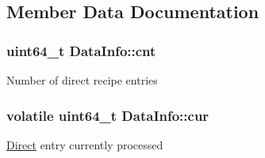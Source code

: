 \subsection{\-Member \-Data \-Documentation}
\hypertarget{structDataInfo_ad390a39f9b2b1bf9cb97b080f145e4cc}{
\subsubsection[{cnt}]{\setlength{\rightskip}{0pt plus 5cm}uint64\-\_\-t {\bf \-Data\-Info\-::cnt}}}\label{structDataInfo_ad390a39f9b2b1bf9cb97b080f145e4cc}
\-Number of direct recipe entries \hypertarget{structDataInfo_af568214ced191e48f92e5373c5273282}{
\subsubsection[{cur}]{\setlength{\rightskip}{0pt plus 5cm}volatile uint64\-\_\-t {\bf \-Data\-Info\-::cur}}}\label{structDataInfo_af568214ced191e48f92e5373c5273282}
\hyperlink{structDirect}{\-Direct} entry currently processed

